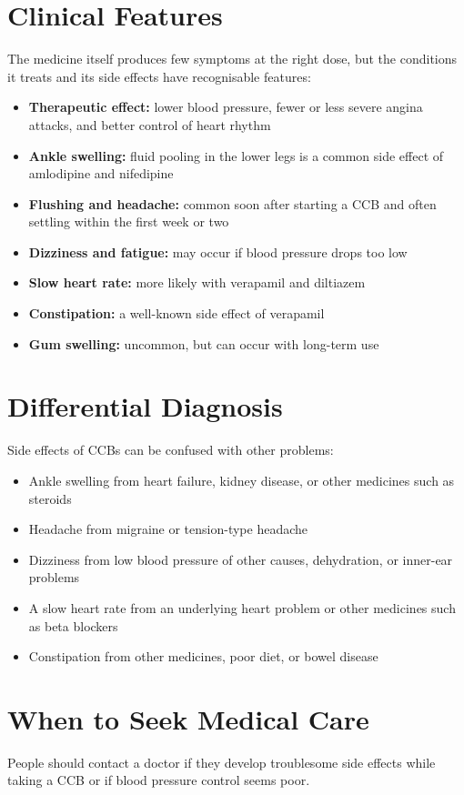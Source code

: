 \section*{Clinical Features}
The medicine itself produces few symptoms at the right dose, but the conditions it treats and its side effects have recognisable features:
\begin{itemize}
    \item \textbf{Therapeutic effect:} lower blood pressure, fewer or less severe angina attacks, and better control of heart rhythm
    \item \textbf{Ankle swelling:} fluid pooling in the lower legs is a common side effect of amlodipine and nifedipine
    \item \textbf{Flushing and headache:} common soon after starting a CCB and often settling within the first week or two
    \item \textbf{Dizziness and fatigue:} may occur if blood pressure drops too low
    \item \textbf{Slow heart rate:} more likely with verapamil and diltiazem
    \item \textbf{Constipation:} a well-known side effect of verapamil
    \item \textbf{Gum swelling:} uncommon, but can occur with long-term use
\end{itemize}

\section*{Differential Diagnosis}
Side effects of CCBs can be confused with other problems:
\begin{itemize}
    \item Ankle swelling from heart failure, kidney disease, or other medicines such as steroids
    \item Headache from migraine or tension-type headache
    \item Dizziness from low blood pressure of other causes, dehydration, or inner-ear problems
    \item A slow heart rate from an underlying heart problem or other medicines such as beta blockers
    \item Constipation from other medicines, poor diet, or bowel disease
\end{itemize}

\section*{When to Seek Medical Care}
People should contact a doctor if they develop troublesome side effects while taking a CCB or if blood pressure control seems poor.

